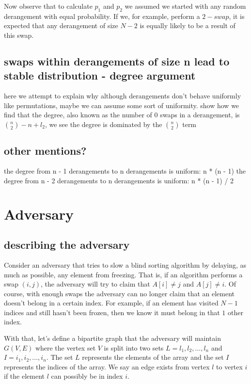 \documentclass{article}
\begin{document}
Now observe that to calculate $p_1$ and $p_2$ we assumed we started with any random derangement
with equal probability. If we, for example, perform a $2-swap$, it is expected that any 
derangement of size $N - 2$ is equally likely to be a result of this swap. 


\subsection{swaps within derangements of size n lead to stable distribution - degree argument}
here we attempt to explain why although derangements don't behave uniformly
like permutations, maybe we can assume some sort of uniformity. 
show how we find that the
degree, also known as the number of 0 swaps in a derangement, is ${n \choose 2} - n + l_2 $, 
we see the degree is dominated by the ${n \choose 2}$ term
\subsection{other mentions?}
the degree from n - 1 derangements to n derangements is uniform: n * (n - 1)
the degree from n - 2 derangements to n derangements is uniform: n * (n - 1) / 2

\section{Adversary}
\subsection{describing the adversary}
Consider an adversary that tries to slow a blind sorting algorithm by delaying, as much as possible, any
element from freezing.
That is, if an algorithm performs a swap $(i, j)$, the adversary will try to claim that $A[i] \neq j$ and
$A[j] \neq i$. Of course, with enough swaps the adversary can no longer claim that an element doesn't
belong in a certain index. For example, if an element has visited $N - 1$ indices and still hasn't been frozen,
then we know it must belong in that $1$ other index.

With that, let's define a bipartite graph that
the adversary will maintain $G(V, E)$ where
the vertex set $V$ is split into two sets $L = {l_1, l_2, ..., l_n}$ and $I = {i_1, i_2, ..., i_n}$.
The set $L$ represents the elements of the array and the set $I$ represents the indices of the array.
We say an edge exists from vertex $l$ to vertex $i$ if the element $l$ can possibly be in index $i$.
\end{document}
